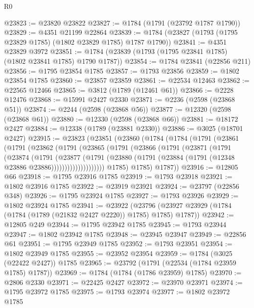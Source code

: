 \begin{lexlean}{R0}
\begin{coremodule}
@23823 := @23820 @23822
@23827 := @1784 (@1791 (@23792 @1787 @1790))
@23829 := @4351 @21199 @22864
@23839 := @1784 (@23827 (@1793 (@1795 @23829 @1785) (@1802 @23829 @1785) @1787 @1790))
@23841 := @4351 @23829 @3972
@23851 := @1784 (@23839 (@1793 (@1795 @23841 @1785) (@1802 @23841 @1785) @1790 @1787))
@23854 := @1784 @23841 (@22856 @211)
@23856 := @1795 @23854 @1785
@23857 := @1793 @23856
@23859 := @1802 @23854 @1785
@23860 := @23857 @23859
@23861 := @22534 @12463
@23862 := @22565 @12466
@23865 := @3812 (@1789 (@12461 @61))
@23866 := @2228 @12476
@23868 := @15991 @2427 @2330
@23871 := @2236 (@2598 (@23868 @51))
@23874 := @2244 (@2598 (@23868 @56))
@23877 := @12320 (@2598 (@23868 @61))
@23880 := @12330 (@2598 (@23868 @66))
@23881 := @18172 @2427
@23884 := @12338 (@1789 (@23881 @2330))
@23886 := @3025 (@18701 @2427)
@23915 := @23823
    (@23851
      (@23860
        (@1784
          (@1784
            (@1791
              (@23861
                (@1791
                  (@23862
                    (@1791
                      (@23865
                        (@1791
                          (@23866
                            (@1791
                              (@23871
                                (@1791
                                  (@23874
                                    (@1791
                                      (@23877
                                        (@1791
                                          (@23880
                                            (@1791
                                              (@23884
                                                (@1791 (@12348 @23886 @23886))))))))))))))))))))
            @1785)
          @1785)
        @1787))
@23916 := @12805 @66
@23918 := @1795 @23916 @1785
@23919 := @1793 @23918
@23921 := @1802 @23916 @1785
@23922 := @23919 @23921
@23924 := @23797 (@22856 @348)
@23926 := @1795 @23924 @1785
@23927 := @1793 @23926
@23929 := @1802 @23924 @1785
@23941 := @23922
    (@23796 (@23927 @23929 (@1784 (@1784 (@1789 (@21832 @2427 @2220)) @1785) @1785) @1787))
@23942 := @12805 @249
@23944 := @1795 @23942 @1785
@23945 := @1793 @23944
@23947 := @1802 @23942 @1785
@23948 := @23945 @23947
@23949 := @22856 @61
@23951 := @1795 @23949 @1785
@23952 := @1793 @23951
@23954 := @1802 @23949 @1785
@23955 := @23952 @23954
@23959 := @1784 (@3025 (@22422 @2427)) @1785
@23965 := @23792 (@1791 (@22534 (@1784 @23959 @1785) @1787))
@23969 := @1784 (@1784 (@1786 @23959) @1785)
@23970 := @2806 @2330
@23971 := @22425 @2427
@23972 := @23970 @23971
@23974 := @1795 @23972 @1785
@23975 := @1793 @23974
@23977 := @1802 @23972 @1785

\end{coremodule}
\end{lexlean}
